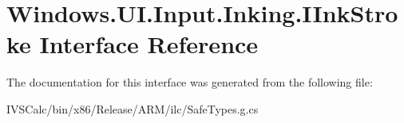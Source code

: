 \hypertarget{interface_windows_1_1_u_i_1_1_input_1_1_inking_1_1_i_ink_stroke}{}\section{Windows.\+U\+I.\+Input.\+Inking.\+I\+Ink\+Stroke Interface Reference}
\label{interface_windows_1_1_u_i_1_1_input_1_1_inking_1_1_i_ink_stroke}


The documentation for this interface was generated from the following file\+:\begin{DoxyCompactItemize}
\item 
I\+V\+S\+Calc/bin/x86/\+Release/\+A\+R\+M/ilc/Safe\+Types.\+g.\+cs\end{DoxyCompactItemize}
